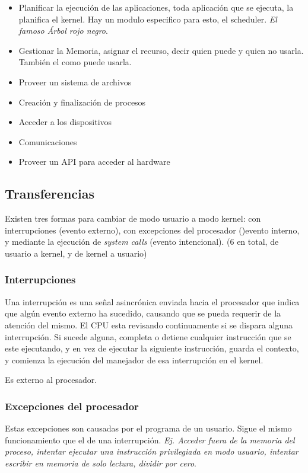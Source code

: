 \documentclass[titlepage,a4paper]{article}
\begin{document}
\begin{itemize}
    \item Planificar la ejecución de las aplicaciones, toda aplicación que se ejecuta, la planifica el kernel. Hay un modulo especifico para esto, el scheduler. \textit{El famoso Árbol rojo negro}.
    \item Gestionar la Memoria, asignar el recurso, decir quien puede y quien no usarla. También el como puede usarla.
    \item Proveer un sistema de archivos
    \item Creación y finalización de procesos
    \item Acceder a los dispositivos
    \item Comunicaciones
    \item Proveer un API para acceder al hardware
\end{itemize}

\subsection*{Transferencias}
Existen tres formas para cambiar de modo usuario a modo kernel: con interrupciones (evento externo), con excepciones del procesador ()evento interno, y mediante la ejecución de \textit{system calls} (evento intencional). (6 en total, de usuario a kernel, y de kernel a usuario)

\subsubsection*{Interrupciones}

Una interrupción es una señal asincrónica enviada hacia el procesador que indica que algún evento externo ha sucedido, causando que se pueda requerir de la atención del mismo. El CPU esta revisando continuamente si se dispara alguna interrupción. Si sucede alguna, completa o detiene cualquier instrucción que se este ejecutando, y en vez de ejecutar la siguiente instrucción, guarda el contexto, y comienza la ejecución del manejador de esa interrupción en el kernel.

Es externo al procesador.

\subsubsection*{Excepciones del procesador}

Estas excepciones son causadas por el programa de un usuario. Sigue el mismo funcionamiento que el de una interrupción. \textit{Ej. Acceder fuera de la memoria del proceso, intentar ejecutar una instrucción privilegiada en modo usuario, intentar escribir en memoria de solo lectura, dividir por cero}.
\end{document}
